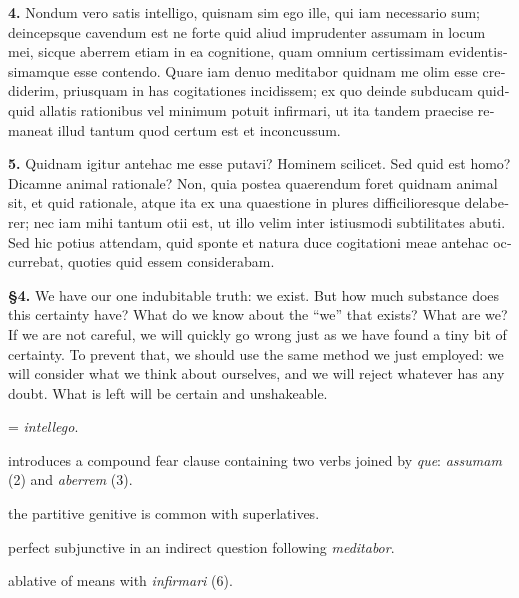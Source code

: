\clearpage

\beginnumbering
\pstart
\begin{latin}
    \textenglish{\textbf{4.}} Nondum vero satis intelligo, quisnam sim ego ille, qui iam necessario sum; deincepsque cavendum est ne forte quid aliud imprudenter assumam in locum mei, sicque aberrem etiam in ea cognitione, quam omnium certissimam evidentissimamque esse contendo. Quare iam denuo meditabor quidnam me olim esse crediderim, priusquam in has cogitationes incidissem; ex quo deinde subducam quidquid allatis rationibus vel minimum potuit infirmari, ut ita tandem praecise remaneat illud tantum quod certum est et inconcussum.
\end{latin}
\pend
\endnumbering

\beginnumbering
\pstart
\begin{latin}
    \textenglish{\textbf{5.}} Quidnam igitur antehac me esse putavi? Hominem scilicet. Sed quid est homo? Dicamne animal rationale? Non, quia postea quaerendum foret quidnam animal sit, et quid rationale, atque ita ex una quaestione in plures difficilioresque delaberer; nec iam mihi tantum otii est, ut illo velim inter istiusmodi subtilitates abuti. Sed hic potius attendam, quid sponte  et natura duce cogitationi meae antehac occurrebat, quoties quid essem considerabam.
\end{latin}
\pend
\endnumbering

\prenotes

\textbf{§4.} We have our one indubitable truth: we exist. But how much substance does this certainty have? What do we know about the ``we'' that exists? What are we? If we are not careful, we will quickly go wrong just as we have found a tiny bit of certainty. To prevent that, we should use the same method we just employed: we will consider what we think about ourselves, and we will reject whatever has any doubt. What is left will be certain and unshakeable.

 = \textit{intellego}.

 introduces a compound fear clause containing two verbs joined by \textit{que}: \textit{assumam} (2) and \textit{aberrem} (3).

 the partitive genitive is common with superlatives.

 perfect subjunctive in an indirect question following \textit{meditabor}.

 ablative of means with \textit{infirmari} (6).

